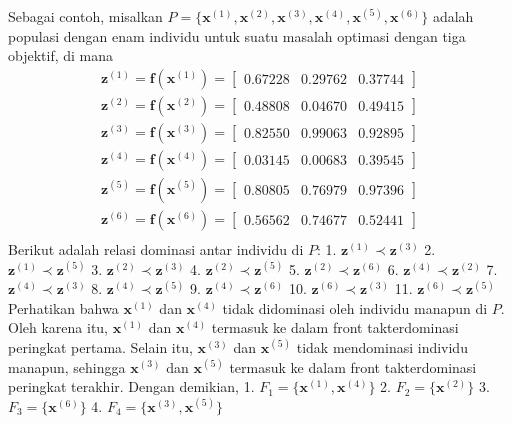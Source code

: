 Sebagai contoh, misalkan $P = \{\mathbf{x}^{(1)},\mathbf{x}^{(2)},\mathbf{x}^{(3)},\mathbf{x}^{(4)},\mathbf{x}^{(5)},\mathbf{x}^{(6)}\}$ adalah populasi dengan enam individu untuk suatu masalah optimasi dengan tiga objektif, di mana $$\begin{align}
\mathbf{z}^{(1)}=\mathbf{f}(\mathbf{x}^{(1)})=\begin{bmatrix}0.67228 & 0.29762 & 0.37744\end{bmatrix}\\
\mathbf{z}^{(2)}=\mathbf{f}(\mathbf{x}^{(2)})=\begin{bmatrix}0.48808 & 0.04670 & 0.49415\end{bmatrix}\\
\mathbf{z}^{(3)}=\mathbf{f}(\mathbf{x}^{(3)})=\begin{bmatrix}0.82550 & 0.99063 & 0.92895\end{bmatrix}\\
\mathbf{z}^{(4)}=\mathbf{f}(\mathbf{x}^{(4)})=\begin{bmatrix}0.03145 & 0.00683 & 0.39545\end{bmatrix}\\
\mathbf{z}^{(5)}=\mathbf{f}(\mathbf{x}^{(5)})=\begin{bmatrix}0.80805 & 0.76979 & 0.97396\end{bmatrix}\\
\mathbf{z}^{(6)}=\mathbf{f}(\mathbf{x}^{(6)})=\begin{bmatrix}0.56562 & 0.74677 & 0.52441\end{bmatrix}\\
\end{align}$$
Berikut adalah relasi dominasi antar individu di $P$:
1. $\mathbf{z}^{(1)} \prec \mathbf{z}^{(3)}$
2. $\mathbf{z}^{(1)} \prec \mathbf{z}^{(5)}$
3. $\mathbf{z}^{(2)} \prec \mathbf{z}^{(3)}$
4. $\mathbf{z}^{(2)} \prec \mathbf{z}^{(5)}$
5. $\mathbf{z}^{(2)} \prec \mathbf{z}^{(6)}$
6. $\mathbf{z}^{(4)} \prec \mathbf{z}^{(2)}$
7. $\mathbf{z}^{(4)} \prec \mathbf{z}^{(3)}$
8. $\mathbf{z}^{(4)} \prec \mathbf{z}^{(5)}$
9. $\mathbf{z}^{(4)} \prec \mathbf{z}^{(6)}$
10. $\mathbf{z}^{(6)} \prec \mathbf{z}^{(3)}$
11. $\mathbf{z}^{(6)} \prec \mathbf{z}^{(5)}$
Perhatikan bahwa $\mathbf{x}^{(1)}$ dan $\mathbf{x}^{(4)}$ tidak didominasi oleh individu manapun di $P$. Oleh karena itu, $\mathbf{x}^{(1)}$ dan $\mathbf{x}^{(4)}$ termasuk ke dalam front takterdominasi peringkat pertama. Selain itu, $\mathbf{x}^{(3)}$ dan $\mathbf{x}^{(5)}$ tidak mendominasi individu manapun, sehingga $\mathbf{x}^{(3)}$ dan $\mathbf{x}^{(5)}$ termasuk ke dalam front takterdominasi peringkat terakhir. Dengan demikian,
1. $F_1 = \{\mathbf{x}^{(1)}, \mathbf{x}^{(4)}\}$
2. $F_2 = \{\mathbf{x}^{(2)}\}$
3. $F_3 = \{\mathbf{x}^{(6)}\}$
4. $F_4 = \{\mathbf{x}^{(3)}, \mathbf{x}^{(5)}\}$


